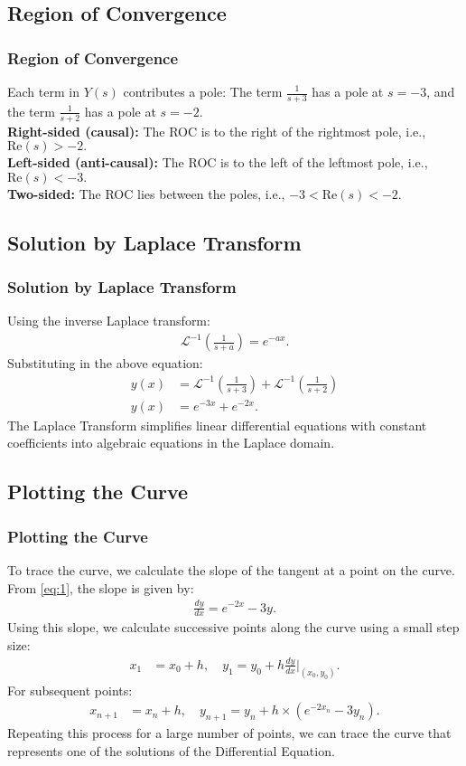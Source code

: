 \documentclass{beamer}
\providecommand{\brak}[1]{\ensuremath{\left(#1\right)}}
\theoremstyle{remark}
\numberwithin{equation}{section}
\begin{document}
\subsection{Region of Convergence}
\begin{frame}
\frametitle{Region of Convergence}
Each term in $Y\brak{s}$ contributes a pole:
The term $\frac{1}{s+3}$ has a pole at $s = -3$, and the term $\frac{1}{s+2}$ has a pole at $s = -2$.\\
\textbf{Right-sided (causal):} The ROC is to the right of the rightmost pole, i.e., $ \text{Re}(s) > -2 .$\\
\textbf{Left-sided (anti-causal):} The ROC is to the left of the leftmost pole, i.e., $ \text{Re}(s) < -3 .$\\
\textbf{Two-sided:} The ROC lies between the poles, i.e., $-3 < \text{Re}(s) < -2 .$
\end{frame}

\subsection{Solution by Laplace Transform}
\begin{frame}
\frametitle{Solution by Laplace Transform}
Using the inverse Laplace transform:
\begin{align}
    \mathcal{L}^{-1}\brak{\frac{1}{s + a}} = e^{-ax}.
\end{align}
Substituting in the above equation:
\begin{align}
y\brak{x} &= \mathcal{L}^{-1}\brak{\frac{1}{s + 3}} + \mathcal{L}^{-1}\brak{\frac{1}{s + 2}} \\
y\brak{x} &= e^{-3x} + e^{-2x}.
\end{align}
The Laplace Transform simplifies linear differential equations with constant coefficients into algebraic equations in the Laplace domain.
\end{frame}

\subsection{Plotting the Curve}
\begin{frame}
\frametitle{Plotting the Curve}
To trace the curve, we calculate the slope of the tangent at a point on the curve. From \eqref{eq:1}, the slope is given by:
\begin{align}
\frac{dy}{dx} = e^{-2x} - 3y.
\end{align}
Using this slope, we calculate successive points along the curve using a small step size:
\begin{align}
x_1 &= x_0 + h, \quad y_1 = y_0 + h \frac{dy}{dx}\bigg|_{\brak{x_0, y_0}}.
\end{align}
For subsequent points:
\begin{align}
x_{n+1} &= x_n + h, \quad y_{n+1} = y_n + h\times\brak{e^{-2x_n} - 3y_n}.
\end{align}
Repeating this process for a large number of points, we can trace the curve that represents one of the solutions of the Differential Equation.
\end{frame}
\end{document}
